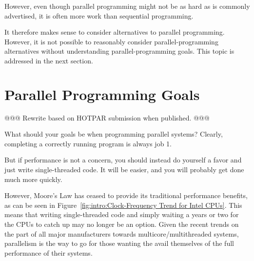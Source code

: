 However, even though parallel programming might not be as hard as
is commonly advertised, it is often more work than sequential
programming.

 \QuickQuizEnd

It therefore makes sense to consider alternatives to parallel programming.
However, it is not possible to reasonably consider parallel-programming
alternatives without understanding parallel-programming goals.
This topic is addressed in the next section.

\section{Parallel Programming Goals}
\label{sec:intro:Parallel Programming Goals}

@@@ Rewrite based on HOTPAR submission when published. @@@

What should your goals be when programming parallel systems?
Clearly, completing a correctly running program is always job 1.

But if performance is not a concern, you should instead do yourself
a favor and just write single-threaded code.
It will be easier, and you will probably get done much more quickly.

However, Moore's Law has ceased to provide its traditional performance
benefits, as can be seen in
Figure~\ref{fig:intro:Clock-Frequency Trend for Intel CPUs}.
This means that writing single-threaded code and simply waiting
a years or two for the CPUs to catch up may no longer be an option.
Given the recent trends on the part of all major manufacturers towards
multicore/multithreaded systems, parallelism is the way to go for
those wanting the avail themselves of the full performance of their
systems.


